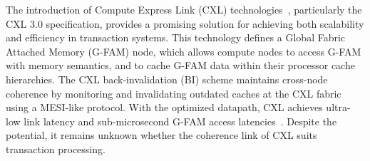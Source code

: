 The introduction of Compute Express Link (CXL) technologies~\cite{cxl-doc, cxl-shortdoc, cxl-paper}, particularly the CXL 3.0 specification, provides a promising solution for achieving both scalability and efficiency in transaction systems. This technology defines a Global Fabric Attached Memory (G-FAM) node, which allows compute nodes to access G-FAM with memory semantics, and to cache G-FAM data within their processor cache hierarchies. The CXL back-invalidation (BI) scheme maintains cross-node coherence by monitoring and invalidating outdated caches at the CXL fabric using a MESI-like protocol. With the optimized datapath, CXL achieves ultra-low link latency and sub-microsecond G-FAM access latencies~\cite{pond, directcxl, tpp_asplos23, cxl_anns_atc23, cxl_demystify, neomem}. Despite the potential, it remains unknown whether the coherence link of CXL suits transaction processing.







